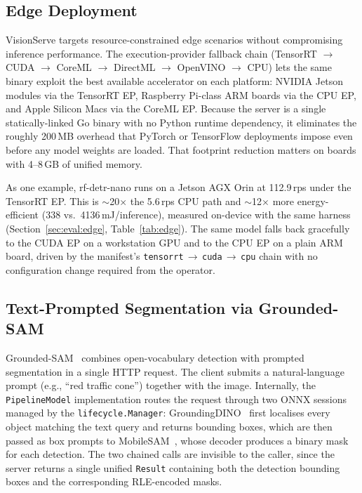 \subsection{Edge Deployment}
\label{subsec:edge-deployment}

VisionServe targets resource-constrained edge scenarios without compromising inference
performance. The execution-provider fallback chain (TensorRT $\to$ CUDA $\to$ CoreML
$\to$ DirectML $\to$ OpenVINO $\to$ CPU) lets the same binary exploit the best
available accelerator on each platform: NVIDIA Jetson modules via the TensorRT EP,
Raspberry Pi-class ARM boards via the CPU EP, and Apple Silicon Macs via the CoreML EP.
Because the server is a single statically-linked Go binary with no Python runtime
dependency, it eliminates the roughly 200\,MB overhead that PyTorch or TensorFlow
deployments impose even before any model weights are loaded. That footprint reduction
matters on boards with 4--8\,GB of unified memory.

As one example, rf-detr-nano runs on a Jetson AGX Orin at 112.9\,rps under the TensorRT
EP. This is $\sim$20$\times$ the 5.6\,rps CPU path and $\sim$12$\times$ more energy-efficient
(338 vs.\ 4136\,mJ/inference), measured on-device with the same harness
(Section~\ref{sec:eval:edge}, Table~\ref{tab:edge}). The same model falls back gracefully to the
CUDA EP on a workstation GPU and to the CPU EP on a plain ARM board, driven by the manifest's
\texttt{tensorrt}\,$\to$\,\texttt{cuda}\,$\to$\,\texttt{cpu} chain with no configuration change
required from the operator.

\subsection{Text-Prompted Segmentation via Grounded-SAM}
\label{subsec:grounded-sam}

Grounded-SAM~\cite{liu2023groundingdino,zhang2023mobilesam} combines open-vocabulary
detection with prompted segmentation in a single HTTP request. The client submits a
natural-language prompt (e.g., ``red traffic cone'') together with the image. Internally,
the \texttt{PipelineModel} implementation routes the request through two ONNX sessions
managed by the \texttt{lifecycle.Manager}: GroundingDINO~\cite{liu2023groundingdino}
first localises every object matching the text query and returns bounding boxes, which
are then passed as box prompts to MobileSAM~\cite{zhang2023mobilesam}, whose decoder
produces a binary mask for each detection. The two chained calls are invisible to the
caller, since the server returns a single unified \texttt{Result} containing both the
detection bounding boxes and the corresponding RLE-encoded masks.

